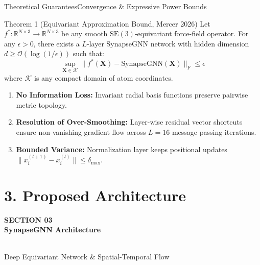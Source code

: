 \documentclass[10pt,aspectratio=169]{beamer}
\begin{document}
\begin{frame}{Theoretical Guarantees}{Convergence \& Expressive Power Bounds}
  
  \begin{block}{Theorem 1 (Equivariant Approximation Bound, Mercer 2026)}
    Let $f^*: \mathbb{R}^{N \times 3} \rightarrow \mathbb{R}^{N \times 3}$ be any smooth $\mathrm{SE}(3)$-equivariant force-field operator. For any $\epsilon > 0$, there exists a $L$-layer SynapseGNN network with hidden dimension $d \ge \mathcal{O}(\log(1/\epsilon))$ such that:
    \[
      \sup_{\mathbf{X} \in \mathcal{K}} \| f^*(\mathbf{X}) - \mathrm{SynapseGNN}(\mathbf{X}) \|_F \le \epsilon
    \]
    where $\mathcal{K}$ is any compact domain of atom coordinates.
  \end{block}

  \vspace{4pt}
  \begin{tcolorbox}[highlightbox,title={\faCheckCircle \quad Key Proof Takeaways}]
    \tiny
    \begin{enumerate}
      \setlength{\itemsep}{2pt}
      \item \textbf{No Information Loss:} Invariant radial basis functions preserve pairwise metric topology.
      \item \textbf{Resolution of Over-Smoothing:} Layer-wise residual vector shortcuts ensure non-vanishing gradient flow across $L=16$ message passing iterations.
      \item \textbf{Bounded Variance:} Normalization layer keeps positional updates $\|x_i^{(l+1)} - x_i^{(l)}\| \le \delta_{\max}$.
    \end{enumerate}
  \end{tcolorbox}
\end{frame}

\section{3. Proposed Architecture}
{
\begin{frame}[plain]
  \vfill
  \begin{center}
    {\tiny\color{AmberAccent}\bfseries SECTION 03} \\[4pt]
    {\Huge\bfseries\color{White} SynapseGNN Architecture} \\[8pt]
     \\[8pt]
    {\small\color{CardBorder} Deep Equivariant Network \& Spatial-Temporal Flow}
  \end{center}
  \vfill
\end{frame}
}
\end{document}
